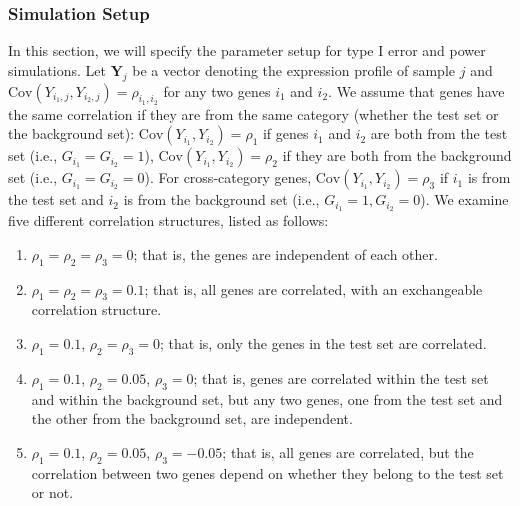 \documentclass[a4,center,fleqn]{NAR}
\newcommand{\OurMethod}{MEACA}
\newcommand{\aaCase}{a}
\newcommand{\aCase}{c}
\newcommand{\cCase}{b}
\newcommand{\eCase}{d}
\newcommand{\fCase}{e}
\begin{document}
	\subsubsection{Simulation Setup}\label{subsection:simulation}
	In this section, we will specify the parameter setup for type I error and power simulations. 
	Let $\bm Y_{j}$ be a vector denoting the expression profile of sample $j$ and 
	$\text{Cov}(Y_{i_1, j}, Y_{i_2, j})=\rho_{i_1,i_2}$ for any two genes $i_1$ and $i_2$. 
	We assume that genes have the same correlation if they are from the same category (whether the 
	test set or the background set): $\text{Cov}(Y_{i_1}, Y_{i_2})= \rho_1$ if
	genes $i_1$ and $i_2$ are both from the test set (i.e., $G_{i_1} = G_{i_2}=1$), 
	$\text{Cov}(Y_{i_1}, Y_{i_2}) =\rho_2$ if they are both from the background set (i.e., $G_{i_1} 
	=
	G_{i_2}=0$). For cross-category genes,  $\text{Cov}(Y_{i_1}, Y_{i_2})= \rho_3$ if $i_1$ is from 
	the test set and 
	$i_2$ is
	from the background set (i.e., $G_{i_1} =1,  G_{i_2}=0$). We examine five different correlation
	structures, listed as follows:
	
	\begin{enumerate}
		\item[(\aaCase):] $\rho_1 = \rho_2 = \rho_3 = 0$; that is, the genes are independent of each
		other.
		\item[(\cCase):] $\rho_1 = \rho_2 = \rho_3 = 0.1$; that is, all genes are correlated, with 
		an exchangeable correlation structure. 
		\item[(\aCase):] $\rho_1 = 0.1$, $\rho_2 = \rho_3 = 0$; that is, only the genes in the test 
		set are correlated.%
		\item[(\eCase):] $\rho_1 = 0.1$, $\rho_2 = 0.05$, $\rho_3 = 0$; that is, 
		genes are correlated within the test set and within the background set, but any two genes, 
		one from the test set and the other from the background set, are independent.
		\item[(\fCase):] $\rho_1 = 0.1$, $\rho_2 = 0.05$, $\rho_3 = -0.05$; that is, all genes are
		correlated, but the correlation between two genes depend on whether they belong to the test 
		set or not.
	\end{enumerate}
	
\end{document}
